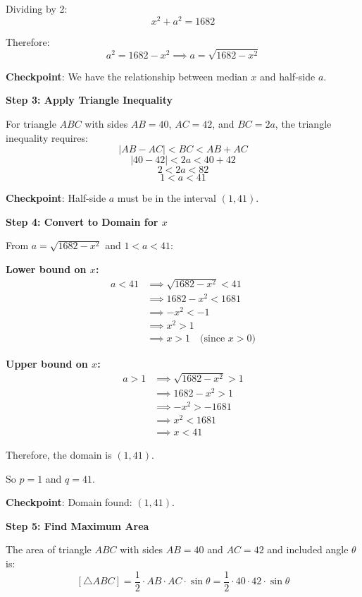 \documentclass[12pt]{article}
\begin{document}
\begin{solutionbox}
Dividing by 2:
$$x^2 + a^2 = 1682$$

Therefore:
$$a^2 = 1682 - x^2 \implies a = \sqrt{1682 - x^2}$$

\textbf{Checkpoint}: We have the relationship between median $x$ and half-side $a$.

\vspace{0.3cm}

\textbf{Step 3: Apply Triangle Inequality}

For triangle $ABC$ with sides $AB = 40$, $AC = 42$, and $BC = 2a$, the triangle inequality requires:
$$|AB - AC| < BC < AB + AC$$
$$|40 - 42| < 2a < 40 + 42$$
$$2 < 2a < 82$$
$$1 < a < 41$$

\textbf{Checkpoint}: Half-side $a$ must be in the interval $(1, 41)$.

\vspace{0.3cm}

\textbf{Step 4: Convert to Domain for $x$}

From $a = \sqrt{1682 - x^2}$ and $1 < a < 41$:

\textbf{Lower bound on $x$:}
\begin{align*}
    a < 41 &\implies \sqrt{1682 - x^2} < 41 \\
    &\implies 1682 - x^2 < 1681 \\
    &\implies -x^2 < -1 \\
    &\implies x^2 > 1 \\
    &\implies x > 1 \quad \text{(since $x > 0$)}
\end{align*}

\textbf{Upper bound on $x$:}
\begin{align*}
    a > 1 &\implies \sqrt{1682 - x^2} > 1 \\
    &\implies 1682 - x^2 > 1 \\
    &\implies -x^2 > -1681 \\
    &\implies x^2 < 1681 \\
    &\implies x < 41
\end{align*}

Therefore, the domain is $\boxed{(1, 41)}$.

So $p = 1$ and $q = 41$.

\textbf{Checkpoint}: Domain found: $(1, 41)$.

\vspace{0.3cm}

\textbf{Step 5: Find Maximum Area}

The area of triangle $ABC$ with sides $AB = 40$ and $AC = 42$ and included angle $\theta$ is:
$$[\triangle ABC] = \frac{1}{2} \cdot AB \cdot AC \cdot \sin\theta = \frac{1}{2} \cdot 40 \cdot 42 \cdot \sin\theta$$


\end{solutionbox}
\end{document}
